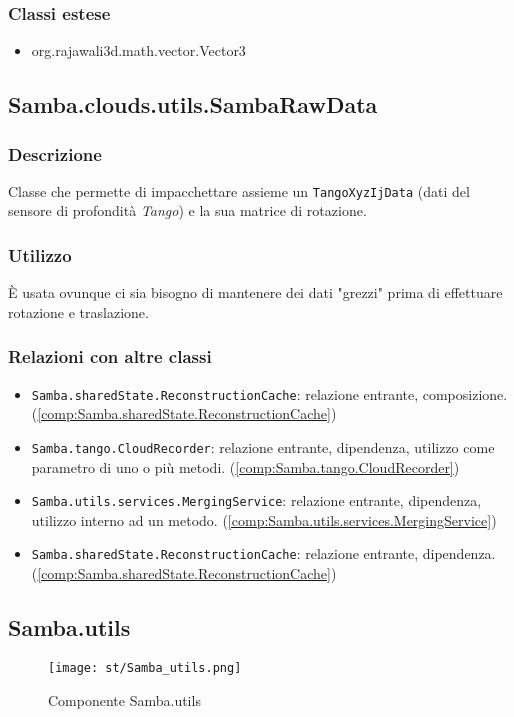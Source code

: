 \subsubsection{Classi estese}
\begin{itemize}
	\item org.rajawali3d.math.vector.Vector3
\end{itemize}

\subsection{Samba.clouds.utils.SambaRawData}\label{comp:Samba.clouds.utils.SambaRawData}
\subsubsection{Descrizione}
Classe che permette di impacchettare assieme un \texttt{TangoXyzIjData} (dati del sensore di profondità \emph{Tango}) e la sua matrice di rotazione.
\subsubsection{Utilizzo}
È usata ovunque ci sia bisogno di mantenere dei dati "grezzi" prima di effettuare rotazione e traslazione.
\subsubsection{Relazioni con altre classi}
\begin{itemize}
	\item \texttt{Samba.sharedState.ReconstructionCache}: relazione entrante, composizione. (\ref{comp:Samba.sharedState.ReconstructionCache})
	\item \texttt{Samba.tango.CloudRecorder}: relazione entrante, dipendenza, utilizzo come parametro di uno o più metodi. (\ref{comp:Samba.tango.CloudRecorder})
	\item \texttt{Samba.utils.services.MergingService}: relazione entrante, dipendenza, utilizzo interno ad un metodo.	 (\ref{comp:Samba.utils.services.MergingService})
	\item \texttt{Samba.sharedState.ReconstructionCache}: relazione entrante, dipendenza. (\ref{comp:Samba.sharedState.ReconstructionCache})
\end{itemize}


\newpage
\subsection{Samba.utils}\label{comp:Samba.utils}
\begin{figure}[H] 
    \centering 
    \texttt{[image: st/Samba\_utils.png]} 
    \caption{Componente Samba.utils}
\end{figure}
